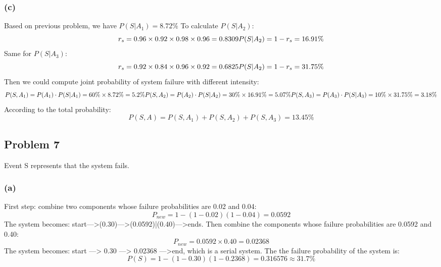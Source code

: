 \documentclass[a4paper]{article}
\begin{document}
\subsubsection{(c)}
Based on previous problem, we have $P(S|A_{1})=8.72 \%$
To calculate $P(S|A_{2})$:
\begin{equation}
	r_{s}=0.96 \times 0.92 \times 0.98 \times 0.96 = 0.8309\\
	P(S|A_{2})=1- r_{s}=16.91 \%
\end{equation}
Same for $P(S|A_{3})$:
\begin{equation}
	r_{s}=0.92 \times 0.84 \times 0.96 \times 0.92 = 0.6825\\
	P(S|A_{2})=1- r_{s}=31.75 \%
\end{equation}
Then we could compute joint probability of system failure with different intensity:
\begin{equation}
	P(S, A_{1})=P(A_{1})\cdot P(S|A_{1})=60 \% \times 8.72 \% =5.2 \%\\
	P(S, A_{2})=P(A_{2})\cdot P(S|A_{2})=30 \% \times 16.91 \% =5.07 \%\\
	P(S, A_{3})=P(A_{3})\cdot P(S|A_{3})=10 \% \times 31.75 \% =3.18 \%
\end{equation}
According to the total probability:
\begin{equation}
	P(S,A)=P(S, A_{1})+P(S, A_{2})+P(S, A_{3})=13.45 \%
\end{equation}
\subsection{Problem 7}
Event S represents that the system fails.
\subsubsection{(a)}
First step: combine two components whose failure probabilities are 0.02 and 0.04:
\begin{equation}
	P_{new}=1-(1-0.02)(1-0.04)=0.0592
\end{equation} 
The system becomes: start--->(0.30)--->(0.0592)|(0.40)--->ends.
Then combine the components whose failure probabilities are 0.0592 and 0.40:
\begin{equation}
	P_{new}=0.0592 \times 0.40 = 0.02368
\end{equation}
The system becomes: start ---> 0.30 ---> 0.02368 --->end, which is a serial system.
The the failure probability of the system is:
\begin{equation}
	P(S)=1-(1-0.30)(1-0.2368)=0.316576 \approx 31.7 \%
\end{equation}
\end{document}
